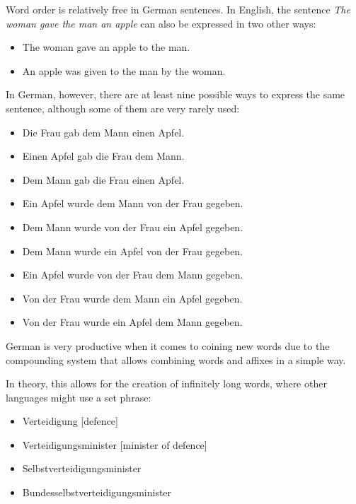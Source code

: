 \documentclass[]{../../metanetpaper}
\begin{document}
\begin{multicols}{2}

Word order is relatively free in German sentences. In English, the sentence \textit{The woman gave the man an apple} can also be expressed in two other ways:
    
\begin{itemize}    
\item The woman gave an apple to the man.
\item An apple was given to the man by the woman.
\end{itemize}


In German, however, there are at least nine possible ways to express the same sentence, although some of them are very rarely used:

\begin{itemize}    
\item Die Frau gab dem Mann einen Apfel.
\item Einen Apfel gab die Frau dem Mann.
\item Dem Mann gab die Frau einen Apfel.
\item Ein Apfel wurde dem Mann von der Frau gegeben.
\item Dem Mann wurde von der Frau ein Apfel gegeben.
\item Dem Mann wurde ein Apfel von der Frau gegeben.
\item Ein Apfel wurde von der Frau dem Mann gegeben.
\item Von der Frau wurde dem Mann ein Apfel gegeben.
\item Von der Frau wurde ein Apfel dem Mann gegeben.
\end{itemize}
 
German is very productive when it comes to coining new words due to the compounding system that allows combining words and affixes in a simple way. 


In theory, this allows for the creation of infinitely long words, where other languages might use a set phrase:

\begin{itemize}
\item Verteidigung [defence] 
\item Verteidigungsminister [minister of defence]
\item Selbstverteidigungsminister
\item Bundesselbstverteidigungsminister 
\end{itemize}
   

\end{multicols}
\end{document}
